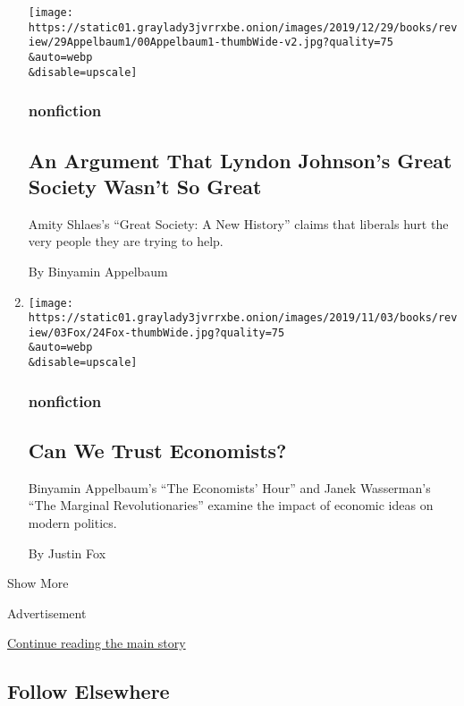 \begin{enumerate}
  \texttt{[image: https://static01.graylady3jvrrxbe.onion/images/2019/12/29/books/review/29Appelbaum1/00Appelbaum1-thumbWide-v2.jpg?quality=75\\\&auto=webp\\\&disable=upscale]}

  \hypertarget{nonfiction}{%
  \subsubsection{nonfiction}\label{nonfiction}}

  \hypertarget{an-argument-that-lyndon-johnsons-great-society-wasnt-so-great}{%
  \subsection{An Argument That Lyndon Johnson's Great Society Wasn't So
  Great}\label{an-argument-that-lyndon-johnsons-great-society-wasnt-so-great}}

  Amity Shlaes's ``Great Society: A New History'' claims that liberals
  hurt the very people they are trying to help.

  By Binyamin Appelbaum
\item
  \href{/2019/10/04/books/review/the-economists-hour-binyamin-appelbaum.html}{}

  \texttt{[image: https://static01.graylady3jvrrxbe.onion/images/2019/11/03/books/review/03Fox/24Fox-thumbWide.jpg?quality=75\\\&auto=webp\\\&disable=upscale]}

  \hypertarget{nonfiction-1}{%
  \subsubsection{nonfiction}\label{nonfiction-1}}

  \hypertarget{can-we-trust-economists}{%
  \subsection{Can We Trust Economists?}\label{can-we-trust-economists}}

  Binyamin Appelbaum's ``The Economists' Hour'' and Janek Wasserman's
  ``The Marginal Revolutionaries'' examine the impact of economic ideas
  on modern politics.

  By Justin Fox
\end{enumerate}

Show More

Advertisement

\protect\hyperlink{after-mid2}{Continue reading the main story}

\hypertarget{follow-elsewhere}{%
\subsection{Follow Elsewhere}\label{follow-elsewhere}}

